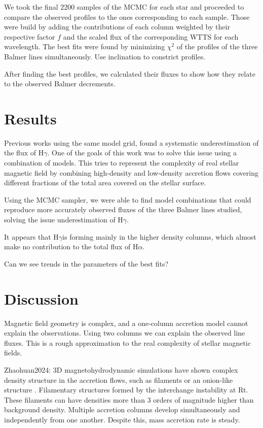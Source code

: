 \documentclass[twocolumn,linenumbers]{aastex631}
\newcommand{\halpha}{H$\alpha$}
\newcommand{\hgamma}{H$\gamma$}
\begin{document}
We took the final 2200 samples of the MCMC for each star and proceeded to compare the observed profiles to the ones corresponding to each sample. Those were build by adding the contributions of each column weighted by their respective factor $f$ and the scaled flux of the corresponding WTTS for each wavelength. The best fits were found by minimizing $\chi^2$ of the profiles of the three Balmer lines simultaneously. Use inclination to constrict profiles.

After finding the best profiles, we calculated their fluxes to show how they relate to the observed Balmer decrements.

\section{Results}

Previous works using the same model grid, found a systematic underestimation of the flux of \hgamma. One of the goals of this work was to solve this issue using a combination of models. This tries to represent the complexity of real stellar magnetic field by combining high-density and low-density accretion flows covering different fractions of the total area covered on the stellar surface.

Using the MCMC sampler, we were able to find model combinations that could reproduce more accurately observed fluxes of the three Balmer lines studied, solving the issue underestimation of \hgamma.

It appears that \hgamma is forming mainly in the higher density columns, which almost make no contribution to the total flux of \halpha. 

Can we see trends in the parameters of the best fits?

\section{Discussion} \label{Discussion}

Magnetic field geometry is complex, and a one-column accretion model cannot explain the observations. Using two columns we can explain the observed line fluxes. This is a rough approximation to the real complexity of stellar magnetic fields.

Zhaohuan2024: 3D magnetohydrodynamic simulations have shown complex density structure in the accretion flows, such as filaments or an onion-like structure \citep{zhaohuan2024}. Filamentary structures formed by the interchange instability at Rt. These filaments can have densities more than 3 orders of magnitude higher than background density. Multiple accretion columns develop simultaneously and independently from one another. Despite this, mass accretion rate is steady.
\end{document}

